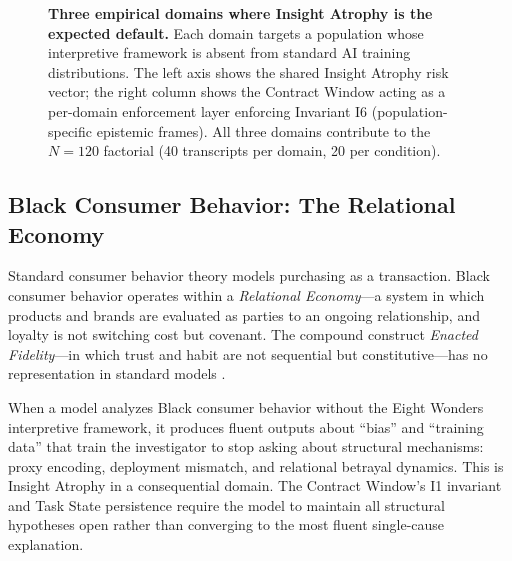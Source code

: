 \documentclass{article}
\newcommand{\cw}{Contract Window\xspace}
\newcommand{\ia}{Insight Atrophy\xspace}
\begin{document}
\begin{figure}[t]
\caption{\textbf{Three empirical domains where Insight Atrophy is the expected
default.} Each domain targets a population whose interpretive framework is
absent from standard AI training distributions. The left axis shows the shared
Insight Atrophy risk vector; the right column shows the Contract Window acting
as a per-domain enforcement layer enforcing Invariant I6 (population-specific
epistemic frames). All three domains contribute to the $N=120$ factorial (40
transcripts per domain, 20 per condition).}
\label{fig:domains}
\end{figure}

\subsection{Black Consumer Behavior: The Relational Economy}

Standard consumer behavior theory models purchasing as a transaction. Black
consumer behavior operates within a \emph{Relational Economy}---a system in
which products and brands are evaluated as parties to an ongoing relationship,
and loyalty is not switching cost but covenant. The compound construct
\emph{Enacted Fidelity}---in which trust and habit are not sequential but
constitutive---has no representation in standard models
\citep{alejandro2026frontin}.

When a model analyzes Black consumer behavior without the Eight Wonders
interpretive framework, it produces fluent outputs about ``bias'' and
``training data'' that train the investigator to stop asking about structural
mechanisms: proxy encoding, deployment mismatch, and relational betrayal
dynamics. This is \ia{} in a consequential domain. The \cw's I1 invariant and
Task State persistence require the model to maintain all structural hypotheses
open rather than converging to the most fluent single-cause explanation.
\end{document}
